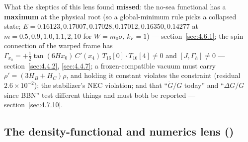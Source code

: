 What the skeptics of this lens found \textbf{missed}: the no-sea functional has a \textbf{maximum} at the physical root (so a global-minimum rule picks a collapsed state; $E = 0.16123, 0.17007, 0.17028, 0.17012, 0.16350, 0.14277$ at $m = 0.5, 0.9, 1.0, 1.1, 2, 10$ for $W = m_0 \sigma$, $k_F = 1$) --- section~\ref{sec:4.6.1}; the spin connection of the warped frame has $\Gamma_{x_0}=+\tfrac12\tan(6Hx_0)\,C'(x_4)\,T_{16}[0]\cdot T_{16}[4]\neq0$ and $[J, \Gamma_{h}] \neq 0$ --- section~\ref{sec:4.4.2}, \ref{sec:4.4.7}; a frozen-compatible vacuum must carry $\rho' = (3H_B + H_C) \rho$, and holding it constant violates the constraint (residual $2.6\times10^{-2}$); the stabilizer's NEC violation; and that ``$\dot G/G$ today'' and ``$\Delta G/G$ since BBN'' test different things and must both be reported --- section~\ref{sec:4.7.10}.

\subsection{The density-functional and numerics lens (\texorpdfstring{}{DFT})}
\label{sec:5.5}

